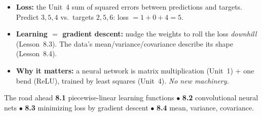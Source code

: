 \documentclass[aspectratio=169, 11pt]{beamer}
\begin{document}
\begin{frame}[t, plain]
  \begin{itemize}
    \setlength{\itemsep}{6pt}
    \item \textbf{Loss:} the Unit~4 sum of squared errors between predictions and targets. Predict
          $3,5,4$ vs.\ targets $2,5,6$: loss $=1+0+4=5$.
    \item \textbf{Learning $=$ gradient descent:} nudge the weights to roll the loss \emph{downhill}
          (Lesson~8.3). The data's mean/variance/covariance describe its shape (Lesson~8.4).
    \item \textbf{Why it matters:} a neural network is matrix multiplication (Unit~1) $+$ one bend (ReLU),
          trained by least squares (Unit~4). \emph{No new machinery.}
  \end{itemize}
  \vspace{2pt}
  \begin{block}{The road ahead}
    \textbf{8.1} piecewise-linear learning functions \;$\bullet$\; \textbf{8.2} convolutional neural nets
    \;$\bullet$\; \textbf{8.3} minimizing loss by gradient descent \;$\bullet$\; \textbf{8.4} mean,
    variance, covariance.
  \end{block}
\end{frame}
\end{document}
